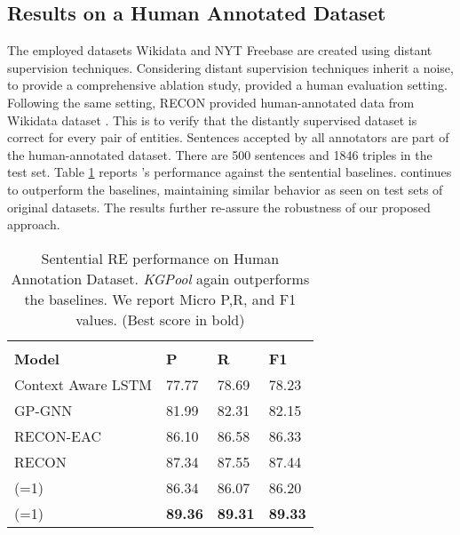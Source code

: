 \documentclass[11pt,a4paper]{article}
\newlength\Origarrayrulewidth
\newcommand{\Cline}[1]{\noalign{\global\setlength\Origarrayrulewidth{\arrayrulewidth}}\noalign{\global\setlength\arrayrulewidth{1.1pt}}\cline{#1}\noalign{\global\setlength\arrayrulewidth{\Origarrayrulewidth}}}
\begin{document}
\subsection{Results on a Human Annotated Dataset}
The employed datasets Wikidata \cite{DBLP:conf/emnlp/SorokinG17} and NYT Freebase  \cite{DBLP:conf/pkdd/RiedelYM10} are created using distant supervision techniques. Considering distant supervision techniques inherit a noise, to provide a comprehensive ablation study, \cite{DBLP:conf/acl/ZhuLLFCS19} provided a human evaluation setting. Following the same setting, RECON provided human-annotated data from Wikidata dataset \cite{DBLP:conf/emnlp/SorokinG17}. This is to verify that the distantly supervised dataset is correct for every pair of entities. Sentences accepted by all annotators are part of the human-annotated dataset. There are 500 sentences and 1846 triples in the test set. Table \ref{tab:human} reports 's performance against the sentential baselines.  continues to outperform the baselines, maintaining similar behavior as seen on test sets of original datasets. The results further re-assure the robustness of our proposed approach. 
\begin{table}[!htb]
    \centering
   \begin{tabular}{p{3.5cm}|p{0.8cm}|p{0.8cm}|p{0.8cm}}
\hline
& & & \\
      \textbf{Model} & \textbf{P} & \textbf{R} & \textbf{F1} \\
        \Cline{1-4}
Context Aware LSTM  & 77.77 & 78.69 & 78.23 \\
       GP-GNN & 81.99 & 82.31 & 82.15 \\
        RECON-EAC & 86.10 & 86.58 & 86.33 \\
           RECON& 87.34 & 87.55 & 87.44 \\
       \hline
 (=1) & 86.34 & 86.07 & 86.20\\
 (=1) & \textbf{89.36} & \textbf{89.31} & \textbf{89.33} \\
       \hline
    \end{tabular}
    \caption{Sentential RE performance on Human Annotation Dataset. \textit{KGPool} again outperforms the baselines. We report Micro P,R, and F1 values. (Best score in bold)}
    \label{tab:human}
        \vspace{-2mm}
\end{table} 
\end{document}
